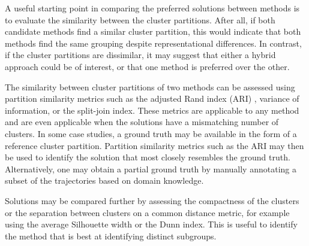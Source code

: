 A useful starting point in comparing the preferred solutions between methods is to evaluate the similarity between the cluster partitions. After all, if both candidate methods find a similar cluster partition, this would indicate that both methods find the same grouping despite representational differences. In contrast, if the cluster partitions are dissimilar, it may suggest that either a hybrid approach could be of interest, or that one method is preferred over the other.

The similarity between cluster partitions of two methods can be assessed using partition similarity metrics such as the adjusted Rand index (ARI) \citep{hubert1985comparing}, variance of information, or the split-join index. These metrics are applicable to any method and are even applicable when the solutions have a mismatching number of clusters. In some case studies, a ground truth may be available in the form of a reference cluster partition. Partition similarity metrics such as the ARI may then be used to identify the solution that most closely resembles the ground truth. Alternatively, one may obtain a partial ground truth by manually annotating a subset of the trajectories based on domain knowledge.

Solutions may be compared further by assessing the compactness of the clusters or the separation between clusters on a common distance metric, for example using the average Silhouette width or the Dunn index. This is useful to identify the method that is best at identifying distinct subgroups.

